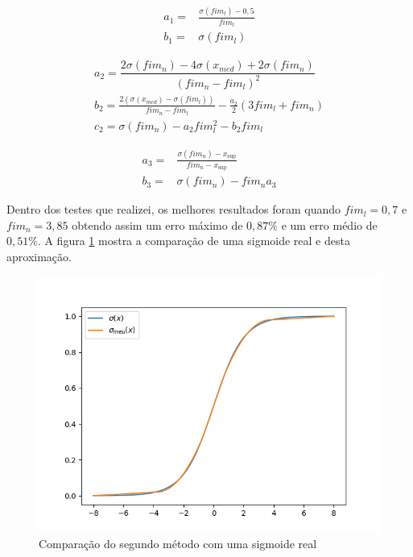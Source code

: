 \documentclass{article}
\begin{document}
\begin{equation}
    \begin{split}
        a_1 =& \frac{\sigma(fim_l) - 0,5}{fim_l} \\
        b_1 =& \sigma(fim_l)
    \end{split}
\end{equation}

\begin{equation}
    \label{eq:coefs_n}
    \begin{split}
        a_2 = \dfrac{2 \sigma(fim_n) - 4 \sigma(x_{med}) + 2 \sigma(fim_n)}{(fim_n - fim_l)^2} \\
        b_2 = \frac{2 (\sigma(x_{med}) - \sigma(fim_l))}{fim_n - fim_l} - \frac{a_2}{2} \left( 3fim_l + fim_n\right) \\
        c_2 = \sigma(fim_n) - a_2 fim_l^2 - b_2 fim_l
    \end{split}
\end{equation}

\begin{equation}
    \begin{split}
        a_3 =& \frac{\sigma(fim_n) - x_{\sup}}{fim_n - x_{\sup}} \\
        b_3 =& \sigma(fim_n) - fim_n a_3
    \end{split}
\end{equation}

Dentro dos testes que realizei, os melhores resultados foram quando $fim_l = 0,7$ e $fim_n = 3,85$ obtendo assim um erro máximo de $0,87\%$ e um erro médio de $0,51\%$. A figura \ref{fig:meu} mostra a comparação de uma sigmoide real e desta aproximação.

\begin{center}
\begin{figure}[h]
\label{fig:meu}
    \caption{Comparação do segundo método com uma sigmoide real}
    \includegraphics[scale=.7]{sig_meu.png}
\end{figure}
\end{center}
\end{document}
